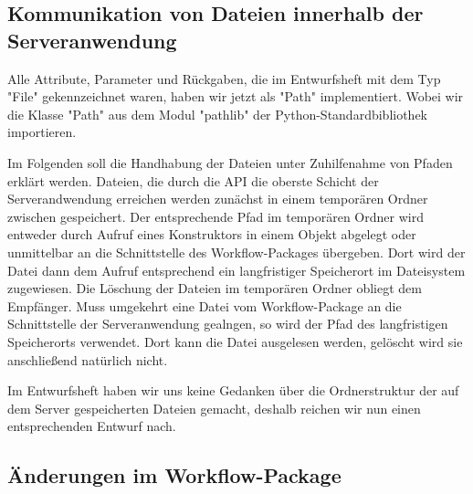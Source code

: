 \subsection{Kommunikation von Dateien innerhalb der Serveranwendung}
Alle Attribute, Parameter und Rückgaben, die im Entwurfsheft mit dem Typ "File" gekennzeichnet waren, haben wir jetzt als "Path" implementiert. Wobei wir die Klasse "Path" aus dem Modul "pathlib" der Python-Standardbibliothek importieren.

Im Folgenden soll die Handhabung der Dateien unter Zuhilfenahme von Pfaden erklärt werden. Dateien, die durch die API die oberste Schicht der Serverandwendung erreichen werden zunächst in einem temporären Ordner zwischen gespeichert. Der entsprechende Pfad im temporären Ordner wird entweder durch Aufruf eines Konstruktors in einem Objekt abgelegt oder unmittelbar an die Schnittstelle des Workflow-Packages übergeben.
Dort wird der Datei dann dem Aufruf entsprechend ein langfristiger Speicherort im Dateisystem zugewiesen. Die Löschung der Dateien im temporären Ordner obliegt dem Empfänger. Muss umgekehrt eine Datei vom Workflow-Package an die Schnittstelle der Serveranwendung gealngen, so wird der Pfad des langfristigen Speicherorts verwendet. Dort kann die Datei ausgelesen werden, gelöscht wird sie anschließend natürlich nicht.

Im Entwurfsheft haben wir uns keine Gedanken über die Ordnerstruktur der auf dem Server gespeicherten Dateien gemacht, deshalb reichen wir nun einen entsprechenden Entwurf nach.

 

\subsection{Änderungen im Workflow-Package}